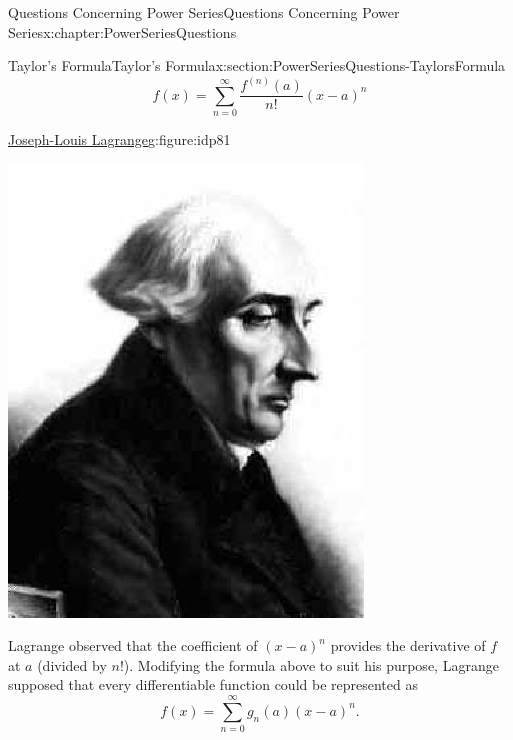 \begin{chapterptx}{Questions Concerning Power Series}{}{Questions Concerning Power Series}{}{}{x:chapter:PowerSeriesQuestions}
\begin{sectionptx}{Taylor's Formula}{}{Taylor's Formula}{}{}{x:section:PowerSeriesQuestions-TaylorsFormula}
\begin{equation*}
			f(x) = \sum_{n=0}^\infty\frac{f^{(n)}(a)}{n!}(x-a)^n
		\end{equation*}
		\begin{figureptx}{\href{https://mathshistory.st-andrews.ac.uk/Biographies/Lagrange/}{Joseph-Louis Lagrange}\protect\footnotemark{}}{g:figure:idp81}{}%
			\begin{image}{0.325}{0.35}{0.325}%
				\includegraphics[width=\linewidth]{external/images/Lagrange.png}
			\end{image}%
			\tcblower
		\end{figureptx}%
		Lagrange observed that the coefficient of \((x-a)^n\) provides the derivative of \(f\) at \(a\) (divided by \(n!\)). Modifying the formula above to suit his purpose, Lagrange supposed that every differentiable function could be represented as%
		\begin{equation*}
			f(x) = \sum_{n=0}^\infty g_n(a)(x-a)^n\text{.}

\end{equation*}
\end{sectionptx}
\end{chapterptx}
